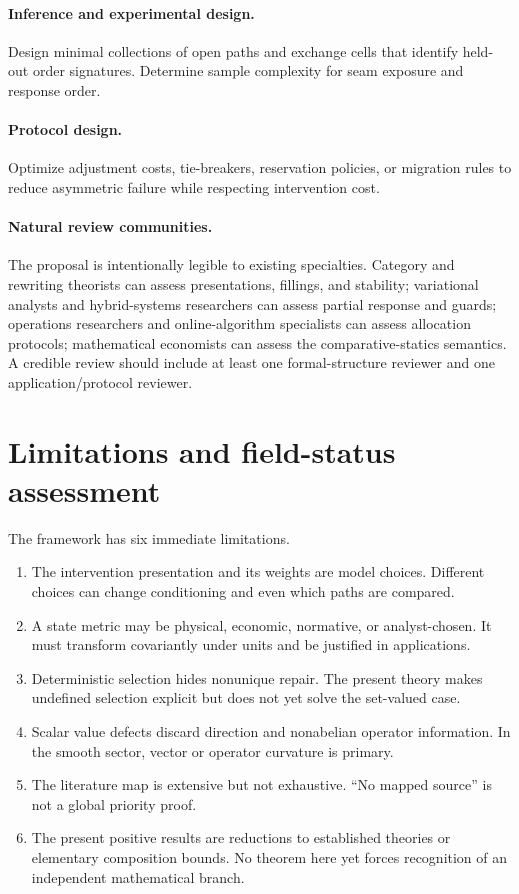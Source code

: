 \documentclass[11pt]{article}
\theoremstyle{definition}
\theoremstyle{remark}
\begin{document}
\paragraph{Inference and experimental design.}
Design minimal collections of open paths and exchange cells that identify
held-out order signatures. Determine sample complexity for seam exposure and
response order.

\paragraph{Protocol design.}
Optimize adjustment costs, tie-breakers, reservation policies, or migration
rules to reduce asymmetric failure while respecting intervention cost.

\paragraph{Natural review communities.}
The proposal is intentionally legible to existing specialties. Category and
rewriting theorists can assess presentations, fillings, and stability;
variational analysts and hybrid-systems researchers can assess partial
response and guards; operations researchers and online-algorithm specialists
can assess allocation protocols; mathematical economists can assess the
comparative-statics semantics. A credible review should include at least one
formal-structure reviewer and one application/protocol reviewer.

\section{Limitations and field-status assessment}

The framework has six immediate limitations.

\begin{enumerate}
\item The intervention presentation and its weights are model choices.
Different choices can change conditioning and even which paths are compared.
\item A state metric may be physical, economic, normative, or analyst-chosen.
It must transform covariantly under units and be justified in applications.
\item Deterministic selection hides nonunique repair. The present theory makes
undefined selection explicit but does not yet solve the set-valued case.
\item Scalar value defects discard direction and nonabelian operator
information. In the smooth sector, vector or operator curvature is primary.
\item The literature map is extensive but not exhaustive. ``No mapped source''
is not a global priority proof.
\item The present positive results are reductions to established theories or
elementary composition bounds. No theorem here yet forces recognition of an
independent mathematical branch.
\end{enumerate}
\end{document}
